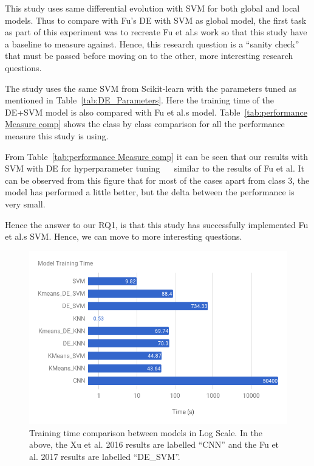 \documentclass[sigconf]{acmart}
\theoremstyle{break}
\begin{document}
  
    This study uses same differential evolution with SVM for both global and local models. Thus to compare with Fu's DE with SVM as global model, the first task as part of this experiment was to recreate Fu et al.\textquotesingle s work so that this study have a baseline to measure against.
  Hence, this research question is a  ``sanity check'' that must be passed before moving on to the other, more interesting research questions.
    
    
    
    The study uses the same SVM from Scikit-learn with the parameters tuned as mentioned in Table~\ref{tab:DE_Parameters}. Here the training time of the DE+SVM model is also compared with Fu et al.\textquotesingle s model. Table~\ref{tab:performance Measure comp}   shows the class by class comparison for all the performance measure this study is using.
    
    From Table~\ref{tab:performance Measure comp}  it can be seen that our results  with SVM with DE for hyperparameter tuning ~\cite{duan2003evaluation}~\cite{fu2017easy} similar to the results of Fu et al. It can be observed from this figure that for most of the cases apart from class 3, the model has performed a little better, but the delta between the performance is very small. 
    
    Hence the answer to our  RQ1, is that this study has successfully implemented Fu et al.\textquotesingle s SVM. Hence, we can move to more interesting questions.
    
    
    
    \begin{figure}[!t]
        \centering
        \includegraphics[width=\linewidth]{fig/Time.png}
        \caption{Training time comparison between models in Log Scale. In the above,
        the Xu et al. 2016 results are labelled ``CNN'' and the Fu et al. 2017
        results are labelled ``DE\_SVM''.}
        \label{fig:time}
    \end{figure}
    
\end{document}
